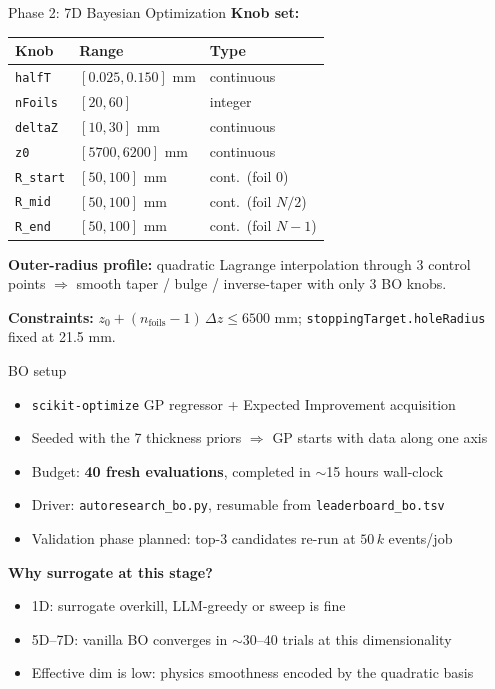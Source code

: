 \documentclass[10pt,aspectratio=169]{beamer}
\begin{document}
\begin{frame}{Phase 2: 7D Bayesian Optimization}
\textbf{Knob set:}

\smallskip
\begin{tabular}{lll}
\toprule
Knob & Range & Type \\
\midrule
\texttt{halfT}      & $[0.025, 0.150]$ mm & continuous \\
\texttt{nFoils}     & $[20, 60]$          & integer \\
\texttt{deltaZ}     & $[10, 30]$ mm       & continuous \\
\texttt{z0}         & $[5700, 6200]$ mm   & continuous \\
\texttt{R\_start}   & $[50, 100]$ mm      & cont.\ (foil 0) \\
\texttt{R\_mid}     & $[50, 100]$ mm      & cont.\ (foil $N/2$) \\
\texttt{R\_end}     & $[50, 100]$ mm      & cont.\ (foil $N{-}1$) \\
\bottomrule
\end{tabular}

\medskip
\textbf{Outer-radius profile:} quadratic Lagrange interpolation through 3 control points
$\Rightarrow$ smooth taper / bulge / inverse-taper with only 3 BO knobs.

\smallskip
\textbf{Constraints:} $z_0 + (n_{\mathrm{foils}}-1)\,\Delta z \leq 6500$ mm;
\texttt{stoppingTarget.holeRadius} fixed at 21.5 mm.
\end{frame}

\begin{frame}{BO setup}
\begin{itemize}
\item \texttt{scikit-optimize} GP regressor + Expected Improvement acquisition
\item Seeded with the 7 thickness priors $\Rightarrow$ GP starts with data along one axis
\item Budget: \textbf{40 fresh evaluations}, completed in $\sim$15 hours wall-clock
\item Driver: \texttt{autoresearch\_bo.py}, resumable from \texttt{leaderboard\_bo.tsv}
\item Validation phase planned: top-3 candidates re-run at $50\,k$ events/job
\end{itemize}

\medskip
\textbf{Why surrogate at this stage?}
\begin{itemize}
\item 1D: surrogate overkill, LLM-greedy or sweep is fine
\item 5D--7D: vanilla BO converges in $\sim 30$--$40$ trials at this dimensionality
\item Effective dim is low: physics smoothness encoded by the quadratic basis
\end{itemize}
\end{frame}
\end{document}
